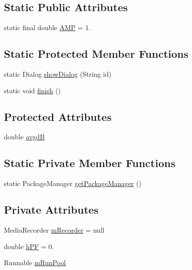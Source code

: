 \subsection*{Static Public Attributes}
\begin{DoxyCompactItemize}
\item 
static final double \hyperlink{classcs_1_1usense_1_1microphone_1_1_sound_manager_ae0b25469186700acabc09e655fb8bfe9}{A\+M\+P} = 1.
\end{DoxyCompactItemize}
\subsection*{Static Protected Member Functions}
\begin{DoxyCompactItemize}
\item 
static Dialog \hyperlink{classcs_1_1usense_1_1microphone_1_1_sound_manager_ac4afe4d33872868da936f44ac4d3fd09}{show\+Dialog} (String id)
\item 
static void \hyperlink{classcs_1_1usense_1_1microphone_1_1_sound_manager_a2b58d527d8f9b6d31aa74e3cd622ab99}{finish} ()
\end{DoxyCompactItemize}
\subsection*{Protected Attributes}
\begin{DoxyCompactItemize}
\item 
double \hyperlink{classcs_1_1usense_1_1microphone_1_1_sound_manager_a579a2ba7e02772e9f0460cf3cb3e1f4b}{avgd\+B}
\end{DoxyCompactItemize}
\subsection*{Static Private Member Functions}
\begin{DoxyCompactItemize}
\item 
static Package\+Manager \hyperlink{classcs_1_1usense_1_1microphone_1_1_sound_manager_a4c960477f018d76591a7d743dfe23e4f}{get\+Package\+Manager} ()
\end{DoxyCompactItemize}
\subsection*{Private Attributes}
\begin{DoxyCompactItemize}
\item 
Media\+Recorder \hyperlink{classcs_1_1usense_1_1microphone_1_1_sound_manager_a9ef598c38a43c11b72944957704b07e4}{m\+Recorder} = null
\item 
double \hyperlink{classcs_1_1usense_1_1microphone_1_1_sound_manager_a084f0ee4775fa8409368743eaa35c261}{h\+P\+F} = 0.
\item 
Runnable \hyperlink{classcs_1_1usense_1_1microphone_1_1_sound_manager_a654ce160547e8ea92271b68ebb11a6b2}{m\+Run\+Pool}
\end{DoxyCompactItemize}
